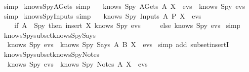 \begin{isabellebody}
  \ simp%
  \endisatagproof
  {\isafoldproof}%
  \isadelimproof
  \isanewline
  \endisadelimproof
  \isanewline
  \isamarkupfalse%
  \ knows{\isacharunderscore}Spy{\isacharunderscore}AGets\ {\isacharbrackleft}simp{\isacharbrackright}\ {\isacharcolon}\isanewline
  \ \ {\isachardoublequoteopen}knows\ Spy\ {\isacharparenleft}AGets\ A\ X\ {\isacharhash}\ evs{\isacharparenright}\ {\isacharequal}\ knows\ Spy\ evs{\isachardoublequoteclose}\isanewline
  \isadelimproof
  \endisadelimproof
  \isatagproof
  \isamarkupfalse%
  \ simp%
  \endisatagproof
  {\isafoldproof}%
  \isadelimproof
  \isanewline
  \endisadelimproof
  \isanewline
  \isamarkupfalse%
  \ knows{\isacharunderscore}Spy{\isacharunderscore}Inputs\ {\isacharbrackleft}simp{\isacharbrackright}\ {\isacharcolon}\isanewline
  \ \ {\isachardoublequoteopen}knows\ Spy\ {\isacharparenleft}Inputs\ A\ P\ X\ {\isacharhash}\ evs{\isacharparenright}\ {\isacharequal}\ \isanewline
  \ \ \ \ {\isacharparenleft}if\ A\ {\isacharequal}\ Spy\ then\ insert\ X\ {\isacharparenleft}knows\ Spy\ evs{\isacharparenright}\isanewline
  \ \ \ \ \ else\ knows\ Spy\ evs{\isacharparenright}{\isachardoublequoteclose}\isanewline
  \isadelimproof
  \endisadelimproof
  \isatagproof
  \isamarkupfalse%
  \ simp%
  \endisatagproof
  {\isafoldproof}%
  \isadelimproof
  \isanewline
  \endisadelimproof
  \isanewline
  \isanewline
  \isamarkupfalse%
  \ knows{\isacharunderscore}Spy{\isacharunderscore}subset{\isacharunderscore}knows{\isacharunderscore}Spy{\isacharunderscore}Says\ {\isacharcolon}\isanewline
  \ \ {\isachardoublequoteopen}knows\ Spy\ evs\ {\isasymsubseteq}\ knows\ Spy\ {\isacharparenleft}Says\ A\ B\ X\ {\isacharhash}\ evs{\isacharparenright}{\isachardoublequoteclose}\isanewline
  \isadelimproof
  \endisadelimproof
  \isatagproof
  \isamarkupfalse%
  \ {\isacharparenleft}simp\ add{\isacharcolon}\ subset{\isacharunderscore}insertI{\isacharparenright}%
  \endisatagproof
  {\isafoldproof}%
  \isadelimproof
  \isanewline
  \endisadelimproof
  \isanewline
  \isamarkupfalse%
  \ knows{\isacharunderscore}Spy{\isacharunderscore}subset{\isacharunderscore}knows{\isacharunderscore}Spy{\isacharunderscore}Notes\ {\isacharcolon}\isanewline
  \ \ {\isachardoublequoteopen}knows\ Spy\ evs\ {\isasymsubseteq}\ knows\ Spy\ {\isacharparenleft}Notes\ A\ X\ {\isacharhash}\ evs{\isacharparenright}{\isachardoublequoteclose}\isanewline
  \isadelimproof
  \endisadelimproof

\end{isabellebody}
